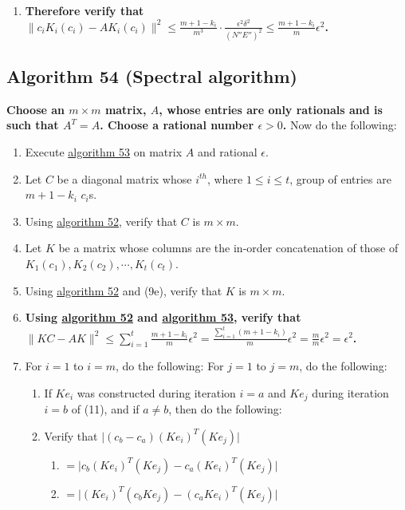 \documentclass[twocolumn]{article}
\begin{document}
\begin{enumerate}
\begin{enumerate}
\begin{enumerate}
					\item \textbf{Therefore verify that $\lVert c_iK_i(c_i)-AK_i(c_i)\rVert^2\le\frac{m+1-k_i}{m^3}\cdot\frac{\epsilon^2\delta^2}{(N''E'')^2}\le\frac{m+1-k_i}{m}\epsilon^2$.}
					\end{enumerate}
				\end{enumerate}
			\end{enumerate}
		\subsection{Algorithm 54 (Spectral algorithm)}\label{sec:algorithm 54}
			\textbf{Choose an $m\times m$ matrix, $A$, whose entries are only rationals and is such that $A^T=A$. Choose a rational number $\epsilon>0$.} Now do the following:
			\begin{enumerate}
				\item Execute \hyperref[sec:algorithm 53]{algorithm 53} on matrix $A$ and rational $\epsilon$.
				\item Let $C$ be a diagonal matrix whose $i^{th}$, where $1\le i\le t$, group of entries are $m+1-k_i$ $c_i$s.
				\item Using \hyperref[sec:algorithm 52]{algorithm 52}, verify that $C$ is $m\times m$.
				\item Let $K$ be a matrix whose columns are the in-order concatenation of those of $K_1(c_1),K_2(c_2),\cdots,K_t(c_t)$.
				\item Using \hyperref[sec:algorithm 52]{algorithm 52} and (9e), verify that $K$ is $m\times m$.
				\item \textbf{Using \hyperref[sec:algorithm 52]{algorithm 52} and \hyperref[sec:algorithm 53]{algorithm 53}, verify that $\lVert KC-AK\rVert^2\le\sum_{i=1}^t\frac{m+1-k_i}{m}\epsilon^2=\frac{\sum_{i=1}^t (m+1-k_i)}{m}\epsilon^2=\frac{m}{m}\epsilon^2=\epsilon^2$.}
				\item For $i=1$ to $i=m$, do the following: For $j=1$ to $j=m$, do the following:
				\begin{enumerate}
					\item If $Ke_i$ was constructed during iteration $i=a$ and $Ke_j$ during iteration $i=b$ of (11), and if $a\ne b$, then do the following:
					\item Verify that $\lvert(c_b-c_a)(Ke_i)^T(Ke_j)\rvert$
					\begin{enumerate}
						\item $=\lvert c_b(Ke_i)^T(Ke_j)-c_a(Ke_i)^T(Ke_j)\rvert$
						\item $=\lvert(Ke_i)^T(c_bKe_j)-(c_aKe_i)^T(Ke_j)\rvert$

\end{enumerate}
\end{enumerate}
\end{enumerate}
\end{document}
